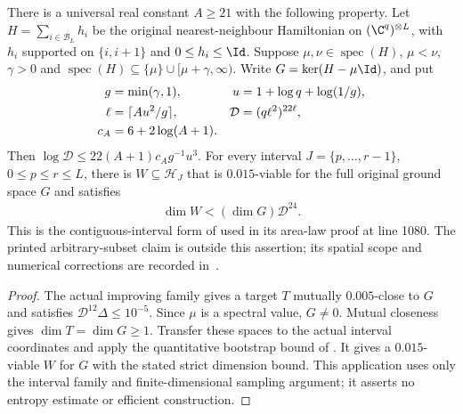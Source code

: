 \begin{lemma}
    \label{thm:physical_interval_bootstrap}
    \leanok
    There is a universal real constant $A\ge21$ with the following property.
    Let $H=\sum_{i\in\mathcal B_L}h_i$ be the original nearest-neighbour
    Hamiltonian on $(\C^q)^{\otimes L}$, with $h_i$ supported on
    $\{i,i+1\}$ and $0\le h_i\le\Id$.
    Suppose $\mu,\nu\in\operatorname{spec}(H)$, $\mu<\nu$, $\gamma>0$ and
    $\operatorname{spec}(H)\subseteq\{\mu\}\cup[\mu+\gamma,\infty)$.
    Write $G=\ker(H-\mu\Id)$, and put
    \begin{align}
        g    & =\min(\gamma,1),      & u          & =1+\log q+\log(1/g),\notag \\
        \ell & =\lceil Au^2/g\rceil, & \mathcal D & =(q\ell^2)^{22\ell},\notag \\
        c_A  & =6+2\log(A+1).
    \end{align}
    Then $\log\mathcal D\le22(A+1)c_Ag^{-1}u^3$.
    For every interval $J=\{p,\ldots,r-1\}$, $0\le p\le r\le L$,
    there is $W\subseteq\mathcal H_J$ that is $0.015$-viable for the full
    original ground space $G$ and satisfies
    \begin{align}
        \dim W<(\dim G)\mathcal D^{24}.
    \end{align}
    This is the contiguous-interval form of
    \cite[Proposition 4.10, lines 1062--1075]{Arad2016RigorousRG} used in
    its area-law proof at line 1080. The printed arbitrary-subset claim is
    outside this assertion; its spatial scope and numerical corrections
    are recorded in~\cite{gap:alvv16_bootstrap_constants}.
\end{lemma}
\begin{proof}
    \leanok
    The actual improving family gives a target $T$ mutually $0.005$-close
    to $G$ and satisfies $\mathcal D^{12}\Delta\le10^{-5}$.
    Since $\mu$ is a spectral value, $G\ne0$. Mutual closeness gives
    $\dim T=\dim G\ge1$. Transfer these spaces to the actual interval
    coordinates and apply the quantitative bootstrap bound of
    \cite[``A quantitative bootstrap bound'']{QICLean2026Blueprint}.
    It gives a $0.015$-viable $W$ for $G$ with the stated strict dimension
    bound. This application uses only the interval family and finite-dimensional
    sampling argument; it asserts no entropy estimate or efficient construction.
\end{proof}

